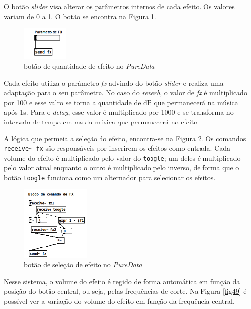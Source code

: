     O botão \textit{slider} visa alterar os parâmetros internos de cada efeito. Os valores variam de 0 a 1. O botão se encontra na Figura \ref{fig47}.

    \begin{figure}[h]
        \centering
        \includegraphics[width=0.2\textwidth]{figuras/fig47.png}
        \caption{botão de quantidade de efeito no \textit{PureData}}
        \label{fig47}
    \end{figure}

    Cada efeito utiliza o parâmetro \textit{fx} advindo do botão \textit{slider} e realiza uma adaptação para o seu parâmetro. No caso do \textit{reverb}, o valor de \textit{fx} é multiplicado por 100 e esse valro se torna a quantidade de dB que permanecerá na música após 1s. Para o \textit{delay}, esse valor é multiplicado por 1000 e se transforma no intervalo de tempo em ms da música que permanecerá no efeito.

    A lógica que permeia a seleção do efeito, encontra-se na Figura \ref{fig48}. Os comandos \texttt{receive\textasciitilde\ fx} são responsáveis por inserirem os efeitos como entrada. Cada volume do efeito é multiplicado pelo valor do \texttt{toogle}; um deles é multiplicado pelo valor atual enquanto o outro é multiplicado pelo inverso, de forma que o botão \texttt{toogle} funciona como um alternador para selecionar os efeitos. 

    \begin{figure}[h]
        \centering
        \includegraphics[width=0.3\textwidth]{figuras/fig48.png}
        \caption{botão de seleção de efeito no \textit{PureData}}
        \label{fig48}
    \end{figure}

    Nesse sistema, o volume do efeito é regido de forma automática em função da posição do botão central, ou seja, pelas frequências de corte. Na Figura \ref{fig49} é possível ver a variação do volume do efeito em função da frequência central.


